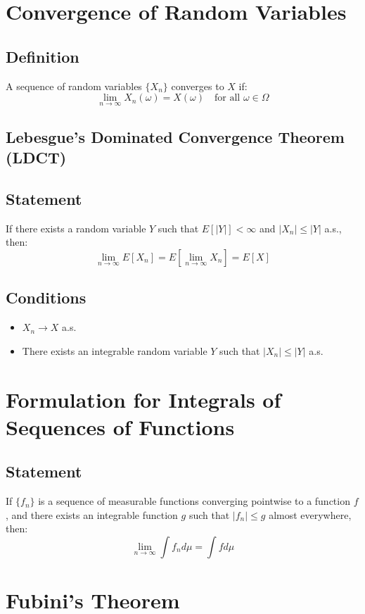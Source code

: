 \documentclass{article}
\begin{document}
\section*{Convergence of Random Variables}

\subsection*{Definition}
A sequence of random variables $\{X_n\}$ converges to $X$ if:
\[
\lim_{n \to \infty} X_n(\omega) = X(\omega) \quad \text{for all } \omega \in \Omega
\]

\subsection*{Lebesgue's Dominated Convergence Theorem (LDCT)}
\subsection*{Statement}
If there exists a random variable $Y$ such that $E[|Y|] < \infty$ and $|X_n| \leq |Y|$ a.s., then:
\[
\lim_{n \to \infty} E[X_n] = E\left[\lim_{n \to \infty} X_n\right] = E[X]
\]

\subsection*{Conditions}
\begin{itemize}
    \item $X_n \to X$ a.s.
    \item There exists an integrable random variable $Y$ such that $|X_n| \leq |Y|$ a.s.
\end{itemize}

\section*{Formulation for Integrals of Sequences of Functions}

\subsection*{Statement}
If $\{f_n\}$ is a sequence of measurable functions converging pointwise to a function $f$, and there exists an integrable function $g$ such that $|f_n| \leq g$ almost everywhere, then:
\[
\lim_{n \to \infty} \int f_n d\mu = \int f d\mu
\]

\section*{Fubini's Theorem}
\end{document}
